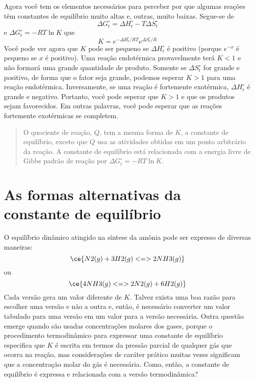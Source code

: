 Agora você tem os elementos necessários para perceber por que algumas reações têm constantes de equilíbrio muito altas e, outras, muito baixas.
Segue-se de \[
    \Delta G_\mathrm{r}^\circ = \Delta H_\mathrm{r}^\circ - T \Delta S_\mathrm{r}^\circ
\] e \(\Delta G_\mathrm{r}^\circ = -RT \ln K\) que \[
    K = e^{-\Delta H_\mathrm{r}^\circ/RT} e^{\Delta S_\mathrm{r}^\circ/R}
\] Você pode ver agora que \(K\) pode ser pequeno se \(\Delta H_\mathrm{r}^\circ\) é positivo (porque \(e^{-x}\) é pequeno se \(x\) é positivo). Uma
reação endotérmica provavelmente terá \(K < 1\) e não formará uma grande quantidade de produto. Somente se \(\Delta S_\mathrm{r}^\circ\) for grande e
positivo, de forma que o fator seja grande, podemos esperar \(K > 1\) para uma reação endotérmica. Inversamente, se uma reação é fortemente
exotérmica, \(\Delta H_\mathrm{r}^\circ\) é grande e negativo. Portanto, você pode esperar que \(K > 1\) e que os produtos sejam favorecidos. Em
outras palavras, você pode esperar que as reações fortemente exotérmicas se completem.

\begin{quote}
O quociente de reação, \(Q\), tem a mesma forma de \(K\), a constante de equilíbrio, exceto que \(Q\) usa as atividades obtidas em um ponto arbitrário
da reação. A constante de equilíbrio está relacionada com a energia livre de Gibbs padrão de reação por \(\Delta G_\mathrm{r}^\circ = -RT \ln K\).
\end{quote}

\section{As formas alternativas da constante de equilíbrio}

O equilíbrio dinâmico atingido na síntese da amônia pode ser expresso de diversas maneiras: \[
    \ce{ N2(g) + 3 H2(g) <=> 2 NH3(g) }
\] ou \[
    \ce{ 4 NH3(g) <=> 2 N2(g) + 6 H2(g) }
\] Cada versão gera um valor diferente de \(K\). Talvez exista uma boa razão para escolher uma versão e não a outra e, então, é necessário converter
um valor tabulado para uma versão em um valor para a versão necessária. Outra questão emerge quando são usadas concentrações molares dos gases, porque
o procedimento termodinâmico para expressar uma constante de equilíbrio especifica que \(K\) é escrita em termos da pressão parcial de qualquer gás
que ocorra na reação, mas considerações de caráter prático muitas vezes significam que a concentração molar do gás é necessária. Como, então, a
constante de equilíbrio é expressa e relacionada com a versão termodinâmica?

